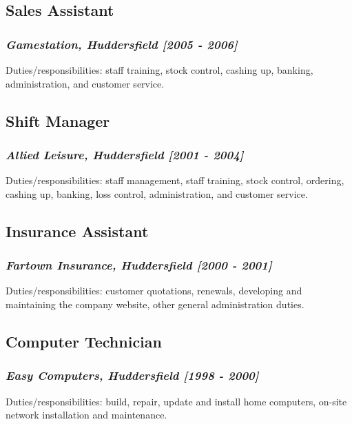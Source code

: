 \documentclass{article}
\begin{document}
\subsection*{Sales Assistant}
\subsubsection*{\emph{Gamestation, Huddersfield [2005 - 2006]}}
Duties/responsibilities: staff training, stock control, cashing up,
          banking, administration, and customer service.
\subsection*{Shift Manager}
\subsubsection*{\emph{Allied Leisure, Huddersfield [2001 - 2004]}}
Duties/responsibilities: staff management, staff training, stock
          control, ordering, cashing up, banking, loss control, administration,
          and customer service.
\subsection*{Insurance Assistant}
\subsubsection*{\emph{Fartown Insurance, Huddersfield [2000 - 2001]}}
Duties/responsibilities: customer quotations, renewals, developing
          and maintaining the company website, other general administration
          duties.
\subsection*{Computer Technician}
\subsubsection*{\emph{Easy Computers, Huddersfield [1998 - 2000]}}
Duties/responsibilities: build, repair, update and install home
          computers, on-site network installation and maintenance.
\end{document}
